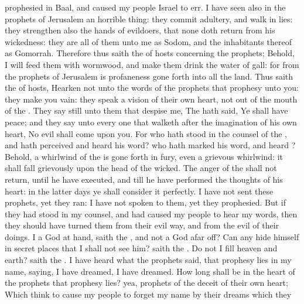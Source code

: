 {prophesied in
Baal, and caused my
people
Israel to
err.
I have
seen also in the
prophets of
Jerusalem an horrible
thing: they commit
adultery, and
walk in
lies: they
strengthen also the
hands of
evildoers, that
none doth
return from his
wickedness: they are all of them unto me as
Sodom, and the
inhabitants thereof as
Gomorrah.
Therefore thus
saith the
{} of
hosts concerning the
prophets; Behold, I will
feed them with
wormwood, and make them
drink the
water of
gall: for from the
prophets of
Jerusalem is
profaneness gone
forth into all the
land.
Thus
saith the
{} of
hosts,
Hearken not unto the
words of the
prophets that
prophesy unto you: they make you
vain: they
speak a
vision of their own
heart,
{} not out of the
mouth of the
{}.
They
say
still unto them that
despise me, The
{} hath
said, Ye shall have
peace; and they
say unto every one that
walketh after the
imagination of his own
heart, No
evil shall
come upon you.
For who hath
stood in the
counsel of the
{}, and hath
perceived and
heard his
word? who hath
marked his
word, and
heard
{}?
Behold, a
whirlwind of the
{} is gone
forth in
fury, even a
grievous
whirlwind: it shall fall
grievously upon the
head of the
wicked.
The
anger of the
{} shall not
return, until he have
executed, and till he have
performed the
thoughts of his
heart: in the
latter
days ye shall
consider it
perfectly.
I have not
sent these
prophets, yet they
ran: I have not
spoken to them, yet they
prophesied.
But if they had
stood in my
counsel, and had caused my
people to
hear my
words, then they should have
turned them from their
evil
way, and from the
evil of their
doings.
 I a
God at
hand,
saith the
{}, and not a
God afar
off?
Can
any
hide himself in secret
places that I shall not
see him?
saith the
{}. Do not I
fill
heaven and
earth?
saith the
{}.
I have
heard what the
prophets
said, that
prophesy
lies in my
name,
saying, I have
dreamed, I have
dreamed.
How long shall
{}
be in the
heart of the
prophets that
prophesy
lies? yea,
{}
prophets of the
deceit of their own
heart;
Which
think to cause my
people to
forget my
name by their
dreams which they
}
